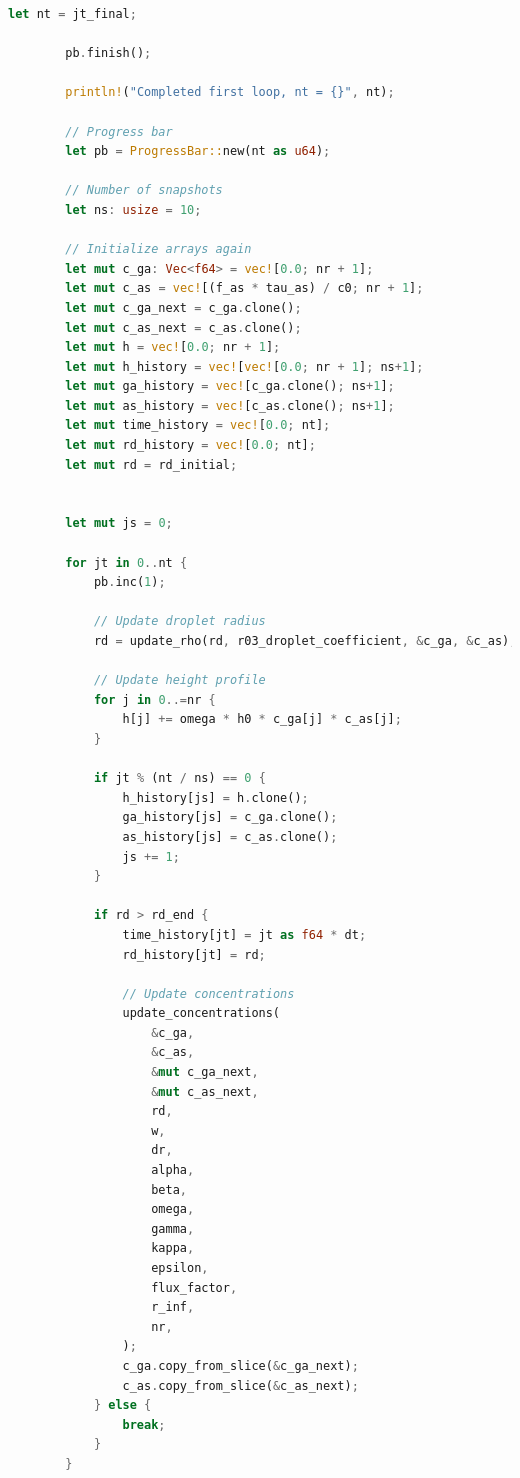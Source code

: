 \documentclass[14pt,oneside]{extarticle}
\begin{document}
\begin{lstlisting}[language=Rust]
        let nt = jt_final;
    
        pb.finish();
    
        println!("Completed first loop, nt = {}", nt);
    
        // Progress bar
        let pb = ProgressBar::new(nt as u64);
    
        // Number of snapshots
        let ns: usize = 10;
    
        // Initialize arrays again
        let mut c_ga: Vec<f64> = vec![0.0; nr + 1];
        let mut c_as = vec![(f_as * tau_as) / c0; nr + 1];
        let mut c_ga_next = c_ga.clone();
        let mut c_as_next = c_as.clone();
        let mut h = vec![0.0; nr + 1];
        let mut h_history = vec![vec![0.0; nr + 1]; ns+1];
        let mut ga_history = vec![c_ga.clone(); ns+1];
        let mut as_history = vec![c_as.clone(); ns+1];
        let mut time_history = vec![0.0; nt];
        let mut rd_history = vec![0.0; nt];
        let mut rd = rd_initial;
    
    
        let mut js = 0;
    
        for jt in 0..nt {
            pb.inc(1);
    
            // Update droplet radius
            rd = update_rho(rd, r03_droplet_coefficient, &c_ga, &c_as);
    
            // Update height profile
            for j in 0..=nr {
                h[j] += omega * h0 * c_ga[j] * c_as[j];
            }
    
            if jt % (nt / ns) == 0 {
                h_history[js] = h.clone();
                ga_history[js] = c_ga.clone();
                as_history[js] = c_as.clone();
                js += 1;
            }
    
            if rd > rd_end {
                time_history[jt] = jt as f64 * dt;
                rd_history[jt] = rd;
    
                // Update concentrations
                update_concentrations(
                    &c_ga,
                    &c_as,
                    &mut c_ga_next,
                    &mut c_as_next,
                    rd,
                    w,
                    dr,
                    alpha,
                    beta,
                    omega,
                    gamma,
                    kappa,
                    epsilon,
                    flux_factor,
                    r_inf,
                    nr,
                );
                c_ga.copy_from_slice(&c_ga_next);
                c_as.copy_from_slice(&c_as_next);
            } else {
                break;
            }
        }
    

\end{lstlisting}
\end{document}
